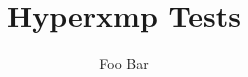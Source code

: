 \documentclass{article}
\title{Hyperxmp Tests}
\author{Foo Bar}
\begin{document}
\maketitle
\lipsum
\end{document}
